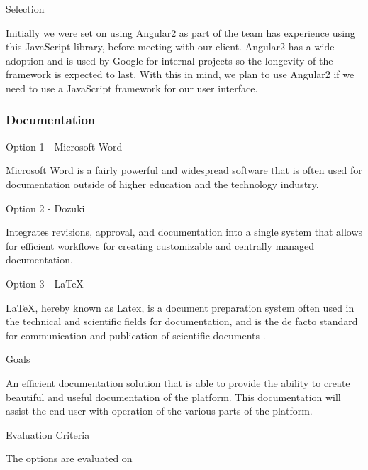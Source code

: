 \documentclass[letterpaper, 10pt, draftclsnofoot, compsoc, onecolumn]{IEEEtran}
\begin{document}
{\medskip
{\noindent Selection \par}
{\noindent Initially we were set on using Angular2 as part of the team has experience using this JavaScript library, before meeting with our client. Angular2 has a wide adoption and is used by Google for internal projects so the longevity of the framework is expected to last. With this in mind, we plan to use Angular2 if we need to use a JavaScript framework for our user interface. \par}




\newpage
\subsubsection{Documentation}
{\noindent Option 1 - Microsoft Word \cite{Word} \par}
{\noindent  Microsoft Word is a fairly powerful and widespread software that is often used for documentation outside of higher education and the technology industry. \par}

\medskip
{\noindent Option 2 - Dozuki \cite{Dozuki} \par}
{\noindent Integrates revisions, approval, and documentation into a single system that allows for efficient workflows for creating customizable and centrally managed documentation. \par}

\medskip
{\noindent Option 3 - LaTeX \cite{Latex} \par}
{\noindent  LaTeX, hereby known as Latex, is a document preparation system often used in the technical and scientific fields for documentation, and is the de facto standard for communication and publication of scientific documents \cite{Latex}. \par}

\medskip
{\noindent Goals \par}
{\noindent An efficient documentation solution that is able to provide the ability to create beautiful and useful documentation of  the platform. This documentation will assist the end user with operation of the various parts of the platform.\par}

\medskip
\newpage
{\noindent Evaluation Criteria \par}
{\noindent The options are evaluated on 

}}
\end{document}
